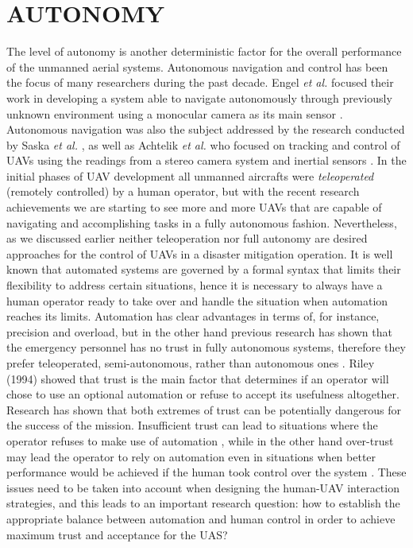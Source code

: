 \documentclass[12pt, letterpaper, oneside]{article}
\begin{document}
\section{AUTONOMY}
The level of autonomy is another deterministic factor for the overall performance of the unmanned aerial systems. Autonomous navigation and control has been the focus of  many researchers during the past decade. Engel \emph{et al.} focused their work in developing a system able to navigate autonomously through previously unknown environment using a monocular camera as its main sensor \cite{13, 14, 15}. Autonomous navigation was also the subject addressed by the research conducted by Saska \emph{et al.} \cite{27}, as well as Achtelik \emph{et al.} who focused on tracking and control of UAVs using the readings from a stereo camera system and inertial sensors \cite{21}. In the initial phases of UAV development all unmanned aircrafts were \emph{teleoperated} (remotely controlled) by a human operator, but with the recent research achievements we are starting to see more and more UAVs that are capable of navigating and accomplishing tasks in a fully autonomous fashion. Nevertheless, as we discussed earlier neither teleoperation nor full autonomy are desired approaches for the control of UAVs in a disaster mitigation operation. It is well known that automated systems are governed by a formal syntax that limits their flexibility to address certain situations, hence it is necessary to always have a human operator ready to take over and handle the situation when automation reaches its limits. Automation has clear advantages in terms of, for instance, precision and overload, but in the other hand previous research has shown that the emergency personnel has no trust in fully autonomous systems, therefore they prefer teleoperated, semi-autonomous, rather than autonomous ones \cite{7}. Riley (1994) showed that trust is the main factor that determines if an operator will chose to use an optional automation or refuse to accept its usefulness altogether. Research has shown that both extremes of trust can be potentially dangerous for the success of the mission. Insufficient trust can lead to situations where the operator refuses to make use of automation \cite{30}, while in the other hand over-trust may lead the operator to rely on automation even in situations when better performance would be achieved if the human took control over the system \cite{4}. These issues need to be taken into account when designing the human-UAV interaction strategies, and this leads to an important research question: how to establish the appropriate balance between automation and human control in order to achieve maximum trust and acceptance for the UAS? \cite{17} 
\end{document}

